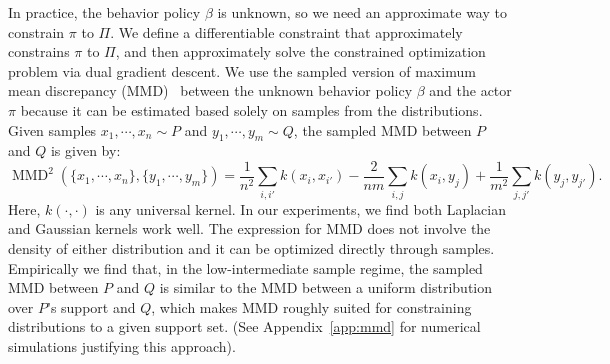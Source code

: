 In practice, the behavior policy $\beta$ is unknown, so we need an approximate way to constrain $\pi$ to $\Pi$. We define a differentiable constraint that approximately constrains $\pi$ to $\Pi$, and then approximately solve the constrained optimization problem via dual gradient descent.  We use the sampled version of maximum mean discrepancy (MMD)~\cite{gretton2012kernel}
between the unknown behavior policy $\beta$ and the actor $\pi$ because it can be estimated based solely on samples from the distributions. Given samples $x_1, \cdots, x_n \sim P$ and $y_1, \cdots, y_m \sim Q$, the sampled MMD between $P$ and $Q$ is given by:\\
$$\operatorname{MMD}^2(\{x_1, \cdots, x_n\}, \{y_1, \cdots, y_m\}) = \frac{1}{n^2} \sum_{i, i'} k(x_i, x_{i'}) - \frac{2}{nm} \sum_{i, j} k(x_i, y_j) + \frac{1}{m^2} \sum_{j, j'} k(y_j, y_{j'}).
$$
Here, $k(\cdot, \cdot)$ is any universal kernel. In our experiments, we find both Laplacian and Gaussian kernels work well.
The expression for MMD does not involve the density of either distribution and it can be optimized directly through samples. Empirically we find that, in the low-intermediate sample regime, the sampled MMD between $P$ and $Q$ is similar to the MMD between a uniform distribution over $P$'s support and $Q$, which makes MMD roughly suited for constraining distributions to a given support set. (See Appendix~\ref{app:mmd} for numerical simulations justifying this approach).


